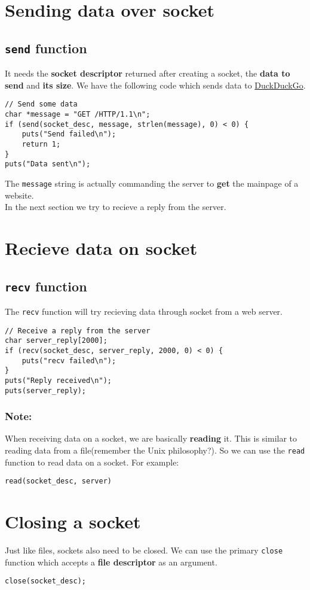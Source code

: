 \documentclass[11pt]{article}
\begin{document}
\section{Sending data over socket}
\label{sec:orgheadline8}
\subsection{\texttt{send} function}
\label{sec:orgheadline7}
It needs the \textbf{socket descriptor} returned after creating a socket, the \textbf{data to
send} and \textbf{its size}. We have the following code which sends data to \href{http://176.34.135.167}{DuckDuckGo}.
\begin{verbatim}
// Send some data
char *message = "GET /HTTP/1.1\n";
if (send(socket_desc, message, strlen(message), 0) < 0) {
	puts("Send failed\n");
	return 1;
}
puts("Data sent\n");
\end{verbatim}
The \texttt{message} string is actually commanding the server to \textbf{get} the mainpage
of a website.\\
In the next section we try to recieve a reply from the server.
\section{Recieve data on socket}
\label{sec:orgheadline11}
\subsection{\texttt{recv} function}
\label{sec:orgheadline10}
The \texttt{recv} function will try recieving data through socket from a web server.
\begin{verbatim}
// Receive a reply from the server
char server_reply[2000];
if (recv(socket_desc, server_reply, 2000, 0) < 0) {
	puts("recv failed\n");
}
puts("Reply received\n");
puts(server_reply);
\end{verbatim}
\subsubsection{Note:}
\label{sec:orgheadline9}
When receiving data on a socket, we are basically \textbf{reading} it. This is similar
to reading data from a file(remember the Unix philosophy?). So we can use the
\texttt{read} function to read data on a socket. For example:
\begin{verbatim}
read(socket_desc, server)
\end{verbatim}
\section{Closing a socket}
\label{sec:orgheadline12}
Just like files, sockets also need to be closed. We can use the primary \texttt{close}
function which accepts a \textbf{file descriptor} as an argument.
\begin{verbatim}
close(socket_desc);
\end{verbatim}
\end{document}
